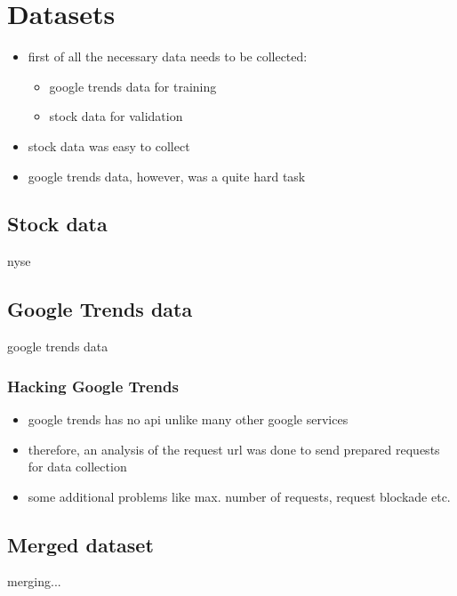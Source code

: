 \section{Datasets}
\label{sec:datasets}
\begin{itemize}
	\item{first of all the necessary data needs to be collected: \\
		\begin{itemize}
			\item google trends data for training
			\item stock data for validation
		\end{itemize}
	}
	\item stock data was easy to collect
	\item google trends data, however, was a quite hard task
\end{itemize}

\subsection{Stock data}
\label{subsec:stockdata}
nyse


\subsection{Google Trends data}
\label{subsec:gtdata}
google trends data

\subsubsection{Hacking Google Trends}
\label{subsub:hackinggt}
\begin{itemize}
	\item google trends has no api unlike many other google services
	\item therefore, an analysis of the request url was done to send prepared requests for data collection
	\item some additional problems like max. number of requests, request blockade etc.
\end{itemize}


\subsection{Merged dataset}
\label{subsec:merged}
merging...